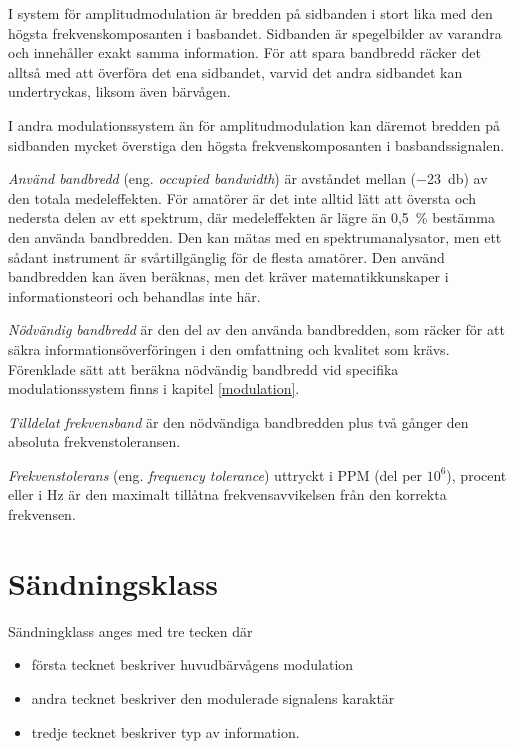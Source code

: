 I system för amplitudmodulation är bredden på sidbanden i stort lika med den
högsta frekvenskomposanten i basbandet.
Sidbanden är spegelbilder av varandra och innehåller exakt samma information.
För att spara bandbredd räcker det alltså med att överföra det ena sidbandet,
varvid det andra sidbandet kan undertryckas, liksom även bärvågen.

I andra modulationssystem än för amplitudmodulation kan däremot bredden på
sidbanden mycket överstiga den högsta frekvenskomposanten i basbandssignalen.

\emph{Använd bandbredd} (eng. \emph{occupied bandwidth}) är avståndet mellan
(\SI{-23}{\decibel}) av den totala medeleffekten.
För amatörer är det inte alltid lätt att översta och nedersta delen av ett
spektrum, där medeleffekten är lägre än 0,5~\% bestämma den använda bandbredden.
Den kan mätas med en spektrumanalysator, men ett sådant instrument är
svårtillgänglig för de flesta amatörer.
Den använd bandbredden kan även beräknas, men det kräver matematikkunskaper i
informationsteori och behandlas inte här.

\emph{Nödvändig bandbredd} är den del av den använda bandbredden, som räcker
för att säkra informationsöverföringen i den omfattning och kvalitet som krävs.
Förenklade sätt att beräkna nödvändig bandbredd vid specifika modulationssystem
finns i kapitel \ref{modulation}.

\emph{Tilldelat frekvensband} är den nödvändiga bandbredden plus två gånger den
absoluta frekvenstoleransen.

\emph{Frekvenstolerans} (eng. \emph{frequency tolerance}) uttryckt i PPM (del
per \(10^6\)), procent eller i \si{\hertz} är den maximalt tillåtna
frekvensavvikelsen från den korrekta frekvensen.

\section{Sändningsklass}

Sändningklass anges med tre tecken där

\begin{itemize}
\item första tecknet beskriver huvudbärvågens modulation
\item andra tecknet beskriver den modulerade signalens karaktär
\item tredje tecknet beskriver typ av information.
\end{itemize}

